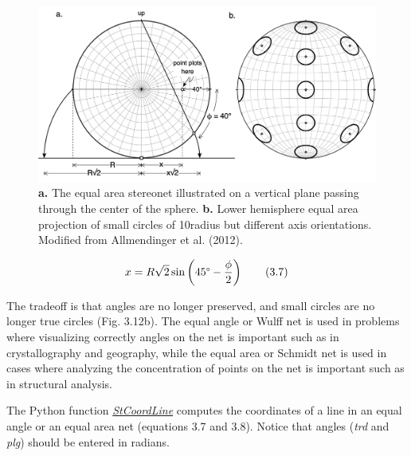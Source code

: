 \documentclass[a4paper , 12pt]{book}
\begin{document}
\begin{figure}[ht]
    \centering
    \includegraphics[width=13cm]{Figures/ch3f12.png}
    \caption{ \textbf{a.} The equal area stereonet illustrated on a vertical plane passing through the center of the sphere. \textbf{b.} Lower hemisphere equal area projection of small circles of 10\degree radius but different axis orientations. Modified from Allmendinger et al. (2012).}
\end{figure}

\begin{equation}
    x = R\sqrt{2}\sin\left(45\degree-\frac{\phi}{2}\right) \tag{3.7}
\end{equation}

The tradeoff is that angles are no longer preserved, and small circles are no longer true circles (Fig. 3.12b). The equal angle or Wulff net is used in problems where visualizing correctly angles on the net is important such as in crystallography and geography, while the equal area or Schmidt net is used in cases where analyzing the concentration of points on the net is important such as in structural analysis.

The Python function \href{http://github.com}{\textit{StCoordLine}} computes the coordinates of a line in an equal angle or an equal area net (equations 3.7 and 3.8).  Notice that angles (\textit{trd} and \textit{plg}) should be entered in radians.
\end{document}
